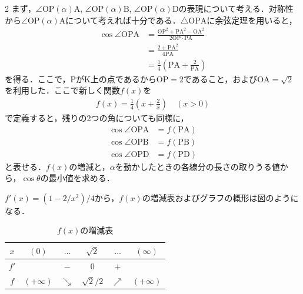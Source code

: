 \documentclass[../../main.tex]{subfiles}
\begin{document}
\begin{multicols}{2}
  まず，$\angle \mathrm{OP}(\alpha)\mathrm{A}$, $\angle \mathrm{OP}(\alpha)\mathrm{B}$, $\angle \mathrm{OP}(\alpha)\mathrm{D}$の表現について考える．対称性から$\angle \mathrm{OP}(\alpha)\mathrm{A}$について考えれば十分である．$\triangle \mathrm{OPA}$に余弦定理を用いると，
  \begin{align*}
    \cos \angle \mathrm{OPA}
     & = \frac{\mathrm{OP}^2 + \mathrm{PA}^2 - \mathrm{OA}^2}{2 \mathrm{OP} \cdot \mathrm{PA}} \\
     & = \frac{2 + \mathrm{PA}^2 }{4\mathrm{PA}}                                               \\
     & = \frac{1}{4} \left(\mathrm{PA} + \frac{2}{\mathrm{PA}}\right)
  \end{align*}
  を得る．ここで，PがK上の点であるから$\mathrm{OP} = 2$であること，および$\mathrm{OA}=\sqrt{2}$を利用した．ここで新しく関数$f(x)$を
  \begin{align*}
    f(x) = \frac{1}{4}\left(x + \frac{2}{x}\right) \quad (x > 0)
  \end{align*}
  で定義すると，残りの2つの角についても同様に，
  \begin{align*}
    \cos \angle \mathrm{OPA} & = f(\mathrm{PA}) \\
    \cos \angle \mathrm{OPB} & = f(\mathrm{PB}) \\
    \cos \angle \mathrm{OPD} & = f(\mathrm{PD})
  \end{align*}
  と表せる．$f(x)$の増減と，$\alpha$を動かしたときの各線分の長さの取りうる値から，$\cos\theta$の最小値を求める．

  $f'(x)=(1-2/x^2)/4$から，$f(x)$の増減表およびグラフの概形は図のようになる．

  \begin{table}[H]
    \centering
    \caption{$f(x)$の増減表}
    \begin{tabular}{|c||c|c|c|c|c|}
      \hline
      $x$  & $(0)$       & $\dots$    & $\sqrt{2}$   & $\dots$    & $(\infty)$  \\
      \hline
      $f'$ &             & $-$        & $0$          & $+$        &             \\
      \hline
      $f$  & $(+\infty)$ & $\searrow$ & $\sqrt{2}/2$ & $\nearrow$ & $(+\infty)$ \\
      \hline
    \end{tabular}
  \end{table}

  \begin{figure}[H]
    \centering
\end{figure}
\end{multicols}
\end{document}
